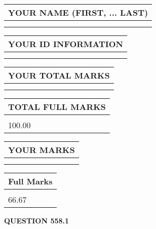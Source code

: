 \documentclass{ctexart}
\begin{document}
   
   
   
\newpage 
\setcounter{page}{ 
   558001 } 
   
   
   
   
\noindent\begin{tabular}{|l|}
\hline
YOUR NAME (FIRST, ... LAST)  \\
\hline
 \\ 
 \\ 
\hline
\end{tabular}
\hspace{0.05in} \begin{tabular}{|l|}
\hline
 YOUR   ID   INFORMATION  \\
\hline
 \\ 
 \\ 
\hline
\end{tabular}
   
   
\vspace{0.2in}\noindent\begin{tabular}{|l|}
\hline
YOUR TOTAL MARKS  \\
\hline
 \\ 
 \\ 
\hline
\end{tabular}
\hspace{0.05in} \begin{tabular}{|l|}
\hline
TOTAL FULL MARKS  \\
\hline
 \\ 
100.00 \\
\hline
\end{tabular}
   
   
 \vspace{0.2in}
 
 
 
 
   
   
  
\vspace{0.2in}
  
\noindent\begin{tabular}{|l|}
\hline
 YOUR MARKS  \\
\hline
 \\ 
 \\ 
\hline
\end{tabular}
\hspace{0.05in} \begin{tabular}{|l|}
\hline
 Full Marks  \\
\hline
 \\ 
66.67 \\
\hline
\end{tabular}
{\textbf{\Large{QUESTION
558.1 
}}}
  
\end{document}
